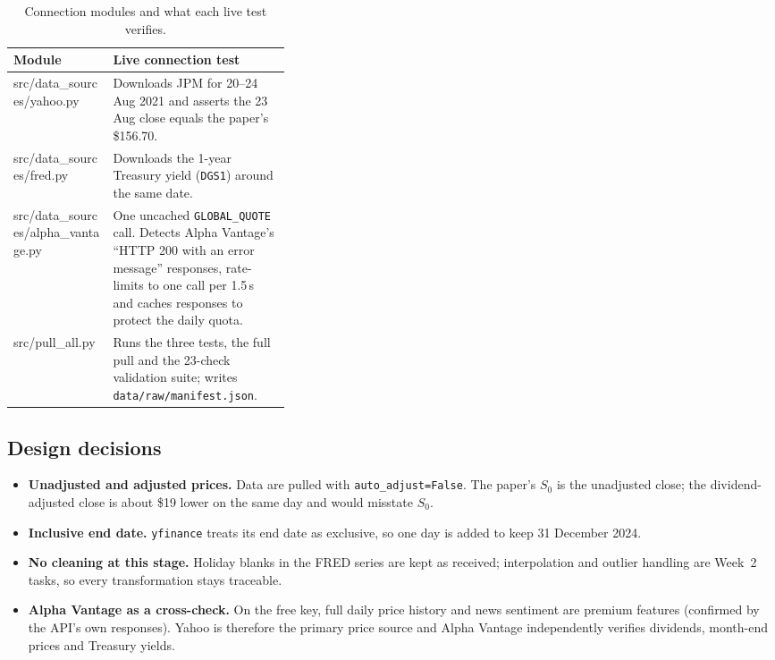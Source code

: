 \documentclass[11pt]{article}
\newcommand{\code}[1]{\texttt{#1}}
\begin{document}
\begin{table}[H]
\centering\small
\caption{Connection modules and what each live test verifies.}
\label{tab:modules}
\begin{tabularx}{\linewidth}{@{}>{\ttfamily}p{0.36\linewidth}L@{}}
\toprule
\normalfont Module & Live connection test \\
\midrule
src/data\_sources/yahoo.py & Downloads JPM for 20--24 Aug 2021 and asserts the 23 Aug close equals the paper's \$156.70. \\
src/data\_sources/fred.py & Downloads the 1-year Treasury yield (\code{DGS1}) around the same date. \\
src/data\_sources/alpha\_vantage.py & One uncached \code{GLOBAL\_QUOTE} call. Detects Alpha Vantage's ``HTTP 200 with an error message'' responses, rate-limits to one call per 1.5\,s and caches responses to protect the daily quota. \\
src/pull\_all.py & Runs the three tests, the full pull and the 23-check validation suite; writes \code{data/raw/manifest.json}. \\
\bottomrule
\end{tabularx}
\end{table}

\subsection{Design decisions}
\begin{itemize}
  \item \textbf{Unadjusted and adjusted prices.} Data are pulled with \code{auto\_adjust=False}. The paper's $S_0$ is
        the unadjusted close; the dividend-adjusted close is about \$19 lower on the same day and would misstate $S_0$.
  \item \textbf{Inclusive end date.} \code{yfinance} treats its end date as exclusive, so one day is added to keep
        31 December 2024.
  \item \textbf{No cleaning at this stage.} Holiday blanks in the FRED series are kept as received; interpolation and
        outlier handling are Week~2 tasks, so every transformation stays traceable.
  \item \textbf{Alpha Vantage as a cross-check.} On the free key, full daily price history and news sentiment are
        premium features (confirmed by the API's own responses). Yahoo is therefore the primary price source and Alpha
        Vantage independently verifies dividends, month-end prices and Treasury yields.
\end{itemize}
\end{document}
